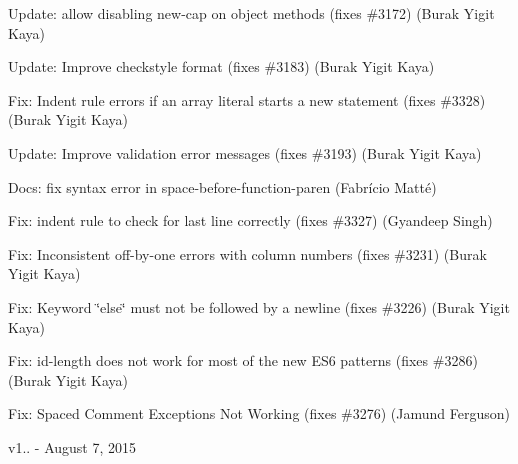 \begin{DoxyItemize}
\item Update\+: allow disabling new-\/cap on object methods (fixes \#3172) (Burak Yigit Kaya)
\item Update\+: Improve checkstyle format (fixes \#3183) (Burak Yigit Kaya)
\item Fix\+: Indent rule errors if an array literal starts a new statement (fixes \#3328) (Burak Yigit Kaya)
\item Update\+: Improve validation error messages (fixes \#3193) (Burak Yigit Kaya)
\item Docs\+: fix syntax error in space-\/before-\/function-\/paren (Fabrício Matté)
\item Fix\+: {\ttfamily indent} rule to check for last line correctly (fixes \#3327) (Gyandeep Singh)
\item Fix\+: Inconsistent off-\/by-\/one errors with column numbers (fixes \#3231) (Burak Yigit Kaya)
\item Fix\+: Keyword \char`\"{}else\char`\"{} must not be followed by a newline (fixes \#3226) (Burak Yigit Kaya)
\item Fix\+: {\ttfamily id-\/length} does not work for most of the new E\+S6 patterns (fixes \#3286) (Burak Yigit Kaya)
\item Fix\+: Spaced Comment Exceptions Not Working (fixes \#3276) (Jamund Ferguson)
\end{DoxyItemize}

v1.. -\/ August 7, 2015


